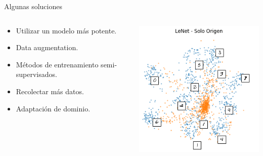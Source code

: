 \documentclass{beamer}
\newcommand{\testcolor}[2]{\colorbox{#1}{#2}}
\begin{document}
\begin{frame}{Algunas soluciones}
      \begin{columns}
            \begin{column}{0.55\textwidth}
                  \begin{itemize}
                        \item Utilizar un modelo más potente.
                        \item Data augmentation.
                        \item Métodos de entrenamiento semi-supervisados.
                        \item Recolectar más datos.
                        \item \testcolor{sintefgreen}{Adaptación de dominio.}
                  \end{itemize}
            \end{column}
            \begin{column}{0.4\textwidth}
                  \includegraphics[width=\textwidth]{images/marco-teorico/umap-lenet-so.png}
            \end{column}
      \end{columns}
\end{frame}
\end{document}

